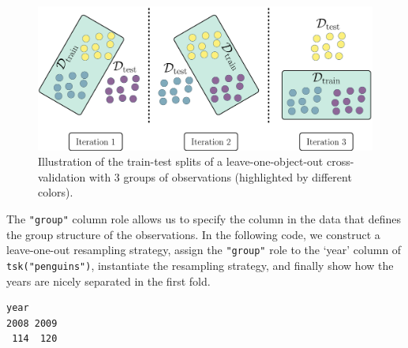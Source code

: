 \begin{figure}

{\centering \includegraphics[width=1\textwidth,height=\textheight]{chapters/chapter3/Figures/mlr3book_figures-7.png}

}

\caption{\label{fig-group}Illustration of the train-test splits of a
leave-one-object-out cross-validation with 3 groups of observations
(highlighted by different colors).}

\end{figure}

The \texttt{"group"} column role allows us to specify the column in the
data that defines the group structure of the observations. In the
following code, we construct a leave-one-out resampling strategy, assign
the \texttt{"group"} role to the `year' column of
\texttt{tsk("penguins")}, instantiate the resampling strategy, and
finally show how the years are nicely separated in the first fold.

\begin{Shaded}
\begin{Highlighting}[]
\OtherTok{=} \NormalTok{(}\NormalTok{)}
\OtherTok{=} \NormalTok{(}\NormalTok{)}
\SpecialCharTok{$}\NormalTok{(}\NormalTok{, }\NormalTok{)}
\SpecialCharTok{$}
\SpecialCharTok{$}\NormalTok{(}\SpecialCharTok{$}\NormalTok{(}\NormalTok{), } \NormalTok{))}
\end{Highlighting}
\end{Shaded}

\begin{verbatim}
year
2008 2009 
 114  120 
\end{verbatim}

